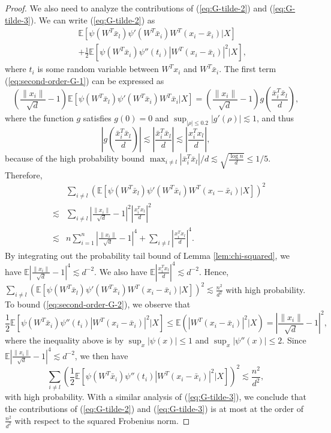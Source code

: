\begin{proof}
We also need to analyze the contributions of (\ref{eq:G-tilde-2}) and (\ref{eq:G-tilde-3}). We can write (\ref{eq:G-tilde-2}) as
\begin{eqnarray}
\label{eq:second-order-G-1} && \mathbb{E}\left[\psi(W^T\bar{x}_l)\psi'(W^T\bar{x}_i)W^T(x_i-\bar{x}_i)|X\right] \\
\label{eq:second-order-G-2} && + \frac{1}{2}\mathbb{E}\left[\psi(W^T\bar{x}_i)\psi''(t_i)|W^T(x_i-\bar{x}_i)|^2|X\right],
\end{eqnarray}
where $t_i$ is some random variable between $W^Tx_i$ and $W^T\bar{x}_i$. The first term (\ref{eq:second-order-G-1}) can be expressed as
$$\left(\frac{\|x_i\|}{\sqrt{d}}-1\right)\mathbb{E}\left[\psi(W^T\bar{x}_l)\psi'(W^T\bar{x}_i)W^T\bar{x}_i|X\right]=\left(\frac{\|x_i\|}{\sqrt{d}}-1\right)g\left(\frac{\bar{x}_i^T\bar{x}_l}{d}\right),$$
where the function $g$ satisfies $g(0)=0$ and $\sup_{|\rho|\leq 0.2}|g'(\rho)|\lesssim 1$, and thus
$$\left|g\left(\frac{\bar{x}_i^T\bar{x}_l}{d}\right)\right|\lesssim \left|\frac{\bar{x}_i^T\bar{x}_l}{d}\right|\lesssim \left|\frac{x_i^Tx_l}{d}\right|,$$
because of the high probability bound $\max_{i\neq l}|\bar{x}_i^T\bar{x}_l|/d\lesssim \sqrt{\frac{\log n}{d}}\leq 1/5$.
Therefore,
\begin{eqnarray}
\nonumber && \sum_{i\neq l}\left(\mathbb{E}\left[\psi(W^T\bar{x}_l)\psi'(W^T\bar{x}_i)W^T(x_i-\bar{x}_i)|X\right]\right)^2 \\
\nonumber &\lesssim& \sum_{i\neq l}\left|\frac{\|x_i\|}{\sqrt{d}}-1\right|^2\left|\frac{{x}_i^T{x}_l}{d}\right|^2 \\
\label{eq:G-H-mixed} &\lesssim& n\sum_{i=1}^n \left|\frac{\|x_i\|}{\sqrt{d}}-1\right|^4 + \sum_{i\neq l}\left|\frac{{x}_i^T{x}_l}{d}\right|^4.
\end{eqnarray}
By integrating out the probability tail bound of Lemma \ref{lem:chi-squared}, we have $\mathbb{E}\left|\frac{\|x_i\|}{\sqrt{d}}-1\right|^4\lesssim d^{-2}$. We also have $\mathbb{E}\left|\frac{{x}_i^T{x}_l}{d}\right|^4\lesssim d^{-2}$. Hence, $\sum_{i\neq l}\left(\mathbb{E}\left[\psi(W^T\bar{x}_l)\psi'(W^T\bar{x}_i)W^T(x_i-\bar{x}_i)|X\right]\right)^2\lesssim \frac{n^2}{d^2}$ with high probability. To bound (\ref{eq:second-order-G-2}), we observe that
$$\frac{1}{2}\mathbb{E}\left[\psi(W^T\bar{x}_i)\psi''(t_i)|W^T(x_i-\bar{x}_i)|^2|X\right]\leq \mathbb{E}(|W^T(x_i-\bar{x}_i)|^2|X)=\left|\frac{\|x_i\|}{\sqrt{d}}-1\right|^2,$$
where the inequality above is by $\sup_x|\psi(x)|\leq 1$ and $\sup_x|\psi''(x)|\leq 2$. Since $\mathbb{E}\left|\frac{\|x_i\|}{\sqrt{d}}-1\right|^4\lesssim d^{-2}$, we then have
$$\sum_{i\neq l}\left(\frac{1}{2}\mathbb{E}\left[\psi(W^T\bar{x}_i)\psi''(t_i)|W^T(x_i-\bar{x}_i)|^2|X\right]\right)^2\lesssim \frac{n^2}{d^2},$$
with high probability. With a similar analysis of (\ref{eq:G-tilde-3}), we conclude that the contributions of (\ref{eq:G-tilde-2}) and (\ref{eq:G-tilde-3}) is at most at the order of $\frac{n^2}{d^2}$ with respect to the squared Frobenius norm.


\end{proof}
